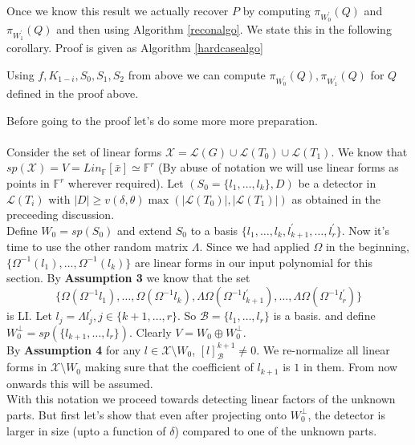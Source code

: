 \documentclass[letterpaper,USenglish,numberwithinsect]{lipics}
\newcommand{\F}{\mathbb{F}}
\newcommand{\ML}{\mathcal{L}}
\newcommand{\MB}{\mathcal{B}}
\newcommand{\MX}{\mathcal{X}}
\newcommand{\B}[1]{\bar{#1}}
\begin{document}
Once we know this result we actually recover $P$ by computing $\pi_{W_0^\prime}(Q)$ and $\pi_{W_1^\prime}(Q)$ and then using
Algorithm \ref{reconalgo}. We state this in the following corollary. Proof is given as Algorithm \ref{hardcasealgo}

\begin{corollary}\label{findprojections}
 Using $f, K_{1-i}, S_0,S_1,S_2$ from above we can compute
$\pi_{W_0^\prime}(Q),
\pi_{W_1^\prime}(Q)$ for $Q$ defined in the proof above.
\end{corollary}

Before going to the proof let's do some more more preparation.


\paragraph{}\label{lambda}
Consider the set of linear forms $\MX = \ML(G)\cup \ML(T_0)\cup \ML(T_1)$. We know
that $sp(\MX) = V = Lin_\F[\B{x}]\simeq \F^r$ (By abuse of notation we will use linear forms as points in $\F^r$ wherever required).
Let $(S_0 = \{l_{1},\ldots,l_{k}\},D)$ be a detector in $\ML(T_i)$ with $|D|\geq
v(\delta,\theta)\max(|\ML(T_{0})|, |\ML(T_{1})|)$ as obtained in the preceeding discussion. \\

Define $W_0 = sp(S_0)$ and extend $S_0$ to a basis
$\{l_1,\ldots,l_k,l_{k+1}^\prime,\ldots,l_r^\prime\}$. Now it's time to use the other random matrix $\Lambda$. Since we had
applied $\Omega$ in the beginning, $\{\Omega^{-1}(l_1),\ldots,\Omega^{-1}(l_k)\}$ are linear forms in our input
polynomial for this section. By {\bf Assumption 3 }
we know that the set
\[
\{\Omega (\Omega^{-1}l_1),\ldots , \Omega (\Omega^{-1}l_k), \Lambda \Omega(\Omega^{-1}l_{k+1}^\prime), \ldots, \Lambda \Omega(\Omega^{-1}l_{r}^\prime)
\}
\]
is LI.  Let $l_j = \Lambda l_j^\prime, j\in \{k+1,\ldots,r\}$. So $\MB = \{l_1,\ldots,l_r\}$ is a basis. and define
$W_0^\perp = sp(\{l_{k+1},\ldots,l_r\})$.
Clearly $V = W_0\oplus W_0^\perp$.\\


By {\bf Assumption 4} for any $l\in \MX \setminus W_0$, $[l]^{k+1}_{\MB} \neq 0$. We re-normalize all linear forms in
$\MX \setminus W_0$ making sure that the coefficient of $l_{k+1}$ is $1$ in them. From now onwards this will be assumed.\\

With this notation we proceed towards detecting linear factors of the unknown parts. But first let's show that even after
projecting onto $W_0^\perp$, the detector is larger in size (upto a function of $\delta$) compared to one of the unknown parts.
\end{document}
